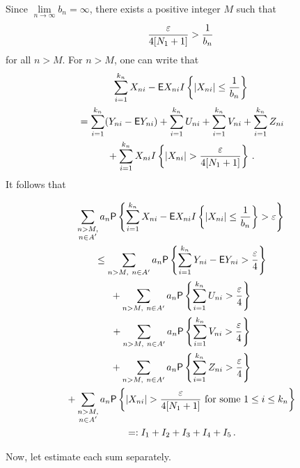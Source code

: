 \begin{multicols}{2}
Since $\lim\limits_{n\to\infty}b_n=\infty$, there exists a positive integer $M$ such that
$$
\displaystyle\frac{\displaystyle \varepsilon\mathstrut}{\displaystyle 4[N_1+1]\mathstrut}>\displaystyle\frac{\displaystyle 1\mathstrut}{\displaystyle b_n\mathstrut}
$$
for all $n>M$. For $n>M$,  one can write that
\begin{multline*} 
\sum\limits_{i=1}^{k_n} X_{ni}- {\sf E}X_{ni}I\left\{|X_{ni}|\le \fr{1}{b_n}\right\}\\
{} = \sum\limits_{i=1}^{k_n}(Y_{ni}-{\sf E}Y_{ni})+ \sum\limits_{i=1}^{k_n} U_{ni} + 
\sum\limits_{i=1}^{k_n} V_{ni}+ \sum\limits_{i=1}^{k_n} Z_{ni}\\
{}+\sum\limits_{i=1}^{k_n} X_{ni} I\left\{|X_{ni}|>\fr{\varepsilon}{4[N_1+1]}\right\}\,. 
\end{multline*}
It follows that

\noindent
\begin{multline*}
\sum\limits_{\substack{{n>M,}\\ {n \in A'}}}  a_n {\sf P}\left\{
\sum\limits_{i=1}^{k_n} X_{ni}- {\sf E}X_{ni}I\left\{|X_{ni}|\le \fr{1}{b_n}\right\}>\varepsilon\right\}\\
{}\le \sum\limits_{n>M, \ n \in A'} a_n {\sf P}\left\{\sum\limits_{i=1}^{k_n} 
Y_{ni}- {\sf E}Y_{ni}>\fr{\varepsilon}{4} \right\}\\
{}+ \sum\limits_{n>M, \ n \in A'} a_n {\sf P}\left\{\sum\limits_{i=1}^{k_n} U_{ni}>
\fr{\varepsilon}{4}\right\}\\
{}+ \sum\limits_{n>M, \ n \in A'} a_n {\sf P}\left\{\sum\limits_{i=1}^{k_n} V_{ni}>
\fr{\varepsilon}{4 }\right\} \\
{}+ \sum\limits_{n>M, \ n \in A'} a_n {\sf P}\left\{\sum\limits_{i=1}^{k_n} Z_{ni}>
\fr{\varepsilon}{4}\right\}\\
{}+ \sum\limits_{\substack{{n>M,}\\ {n \in A'}}} a_n 
{\sf P}\left\{ |X_{ni}|>\fr{\varepsilon}{4[N_1+1]} 
\mbox{ for some }1\le i\le k_n \right\}\\
{}=:I_1+I_2+I_3+I_4+I_5\,.
\end{multline*}

Now, let estimate each sum separately.


\end{multicols}
